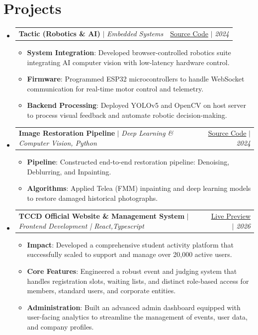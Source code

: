 \documentclass[letterpaper,11pt]{article}
\makeatletter
\newcommand{\resumeItem}[2]{\item\small{\textbf{#1}{: #2 \vspace{-2pt}}}}
\newcommand{\resumeProjectSubheading}[3]{
  \vspace{-1pt}\item
    \begin{tabular*}{0.97\textwidth}{l@{\extracolsep{\fill}}r}
      \textbf{#1} $|$ \textit{\small#2} & #3 \\
    \end{tabular*}\vspace{-5pt}
}
\newcommand{\resumeSubHeadingListStart}{\begin{itemize}[leftmargin=*]}
\newcommand{\resumeSubHeadingListEnd}{\end{itemize}}
\newcommand{\resumeItemListStart}{\begin{itemize}}
\newcommand{\resumeItemListEnd}{\end{itemize}\vspace{-5pt}}
\makeatother
\begin{document}
\section{Projects}
  \resumeSubHeadingListStart
    \resumeProjectSubheading
      {Tactic (Robotics \& AI)}{Embedded Systems}{\href{https://github.com/roboSobia}{Source Code} $|$ \textit{\small 2024}}
      \resumeItemListStart
        \resumeItem{System Integration}
          {Developed browser-controlled robotics suite integrating AI computer vision with low-latency hardware control.}
        \resumeItem{Firmware}
          {Programmed ESP32 microcontrollers to handle WebSocket communication for real-time motor control and telemetry.}
        \resumeItem{Backend Processing}
          {Deployed YOLOv5 and OpenCV on host server to process visual feedback and automate robotic decision-making.}
      \resumeItemListEnd
    \vspace{4pt}
    \resumeProjectSubheading
      {Image Restoration Pipeline}{Deep Learning \& Computer Vision, Python}{\href{https://github.com/ahmedfathy0-0/Image-Colorization-of-Historical-Photos}{Source Code} $|$ \textit{\small 2024}}
      \resumeItemListStart
        \resumeItem{Pipeline}
          {Constructed end-to-end restoration pipeline: Denoising, Deblurring, and Inpainting.}
        \resumeItem{Algorithms}
          {Applied Telea (FMM) inpainting and deep learning models to restore damaged historical photographs.}
      \resumeItemListEnd
    \vspace{4pt}
    \resumeProjectSubheading
      {TCCD Official Website \& Management System}{Frontend Development | React,Typescript}{\href{https://tccd.eng.cu.edu.eg/}{Live Preview} $|$ \textit{\small 2026}}
      \resumeItemListStart
        \resumeItem{Impact}
          {Developed a comprehensive student activity platform that successfully scaled to support and manage over 20,000 active users.}
        \resumeItem{Core Features}
          {Engineered a robust event and judging system that handles registration slots, waiting lists, and distinct role-based access for members, standard users, and corporate entities.}
        \resumeItem{Administration}
          {Built an advanced admin dashboard equipped with user-facing analytics to streamline the management of events, user data, and company profiles.}
      \resumeItemListEnd
  \resumeSubHeadingListEnd
\end{document}
